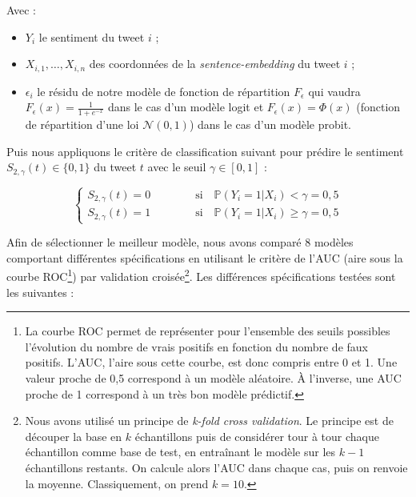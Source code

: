 \documentclass[11pt,french,french]{article}
\let\rmarkdownfootnote\footnote%
\def\footnote{\protect\rmarkdownfootnote}
\begin{document}
Avec :

\begin{itemize}
\item $Y_i$ le sentiment du tweet $i$ ;
\item $X_{i,1}, \dots, X_{i,n}$ des coordonnées de la \emph{sentence-embedding} du tweet $i$ ;
\item $\epsilon_i$ le résidu de notre modèle de fonction de répartition $F_{\epsilon}$ qui vaudra $F_{\epsilon}(x) = \frac{1}{1 + e^{-x}}$ dans le cas d'un modèle logit et $F_{\epsilon}(x) = \Phi(x)$ (fonction de répartition d'une loi $\mathcal{N}(0, 1)$) dans le cas d'un modèle probit. 
\end{itemize}

Puis nous appliquons le critère de classification suivant pour prédire
le sentiment \(S_{2,\gamma}(t) \in \{0,1\}\) du tweet \(t\) avec le
seuil \(\gamma \in [0,1]\) :

\[\begin{cases}
S_{2,\gamma}(t) = 0 \qquad \qquad \text{si} \quad \mathbb{P}(Y_i = 1 | X_{i}) < \gamma = 0,5 \\
S_{2,\gamma}(t) = 1 \qquad \qquad \text{si} \quad \mathbb{P}(Y_i = 1 | X_{i}) \ge \gamma = 0,5
\end{cases}
\]

Afin de sélectionner le meilleur modèle, nous avons comparé 8 modèles
comportant différentes spécifications en utilisant le critère de l'AUC
(aire sous la courbe ROC\footnote{La courbe ROC permet de représenter
  pour l'ensemble des seuils possibles l'évolution du nombre de vrais
  positifs en fonction du nombre de faux positifs. L'AUC, l'aire sous
  cette courbe, est donc compris entre 0 et 1. Une valeur proche de 0,5
  correspond à un modèle aléatoire. À l'inverse, une AUC proche de 1
  correspond à un très bon modèle prédictif.}) par validation
croisée\footnote{Nous avons utilisé un principe de \emph{k-fold cross
  validation}. Le principe est de découper la base en \(k\) échantillons
  puis de considérer tour à tour chaque échantillon comme base de test,
  en entraînant le modèle sur les \(k-1\) échantillons restants. On
  calcule alors l'AUC dans chaque cas, puis on renvoie la moyenne.
  Classiquement, on prend \(k=10\).}. Les différences spécifications
testées sont les suivantes :
\end{document}
